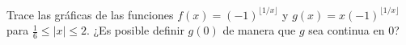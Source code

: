 \item Trace las gráficas de las funciones $f(x) = (-1)^{\lfloor 1/x \rfloor}$ y $g(x) = x(-1)^{\lfloor 1/x \rfloor}$ para $\frac{1}{6} \le |x| \le 2$. ¿Es posible definir $g(0)$ de manera que $g$ sea continua en 0?
